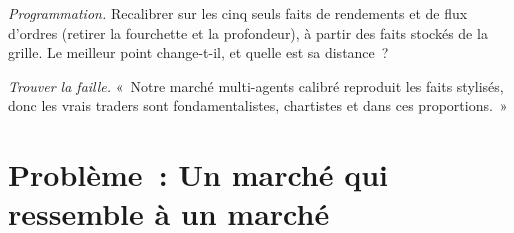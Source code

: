 \begin{exercise}[$\star\star\star$]\label{exo:mx:build-an-agent-based-market:7}
\emph{Programmation.} Recalibrer sur les cinq seuls faits de rendements et de flux d'ordres (retirer la fourchette et la profondeur), à partir des faits stockés de la grille. Le meilleur point
change-t-il, et quelle est sa distance~?
\end{exercise}

\begin{exercise}[$\star\star\star$]\label{exo:mx:build-an-agent-based-market:8}
\emph{Trouver la faille.} «~Notre marché multi-agents calibré reproduit les faits stylisés, donc les vrais traders sont fondamentalistes, chartistes et  dans ces proportions.~»
\end{exercise}

\section{Problème~: Un marché qui ressemble à un marché}

